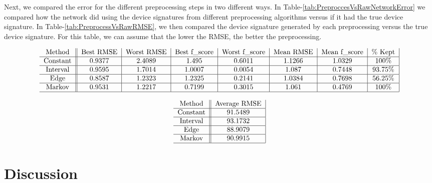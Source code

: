 \documentclass{article}
\begin{document}
Next, we compared the error for the different preprocessing steps in two different ways.
In Table-\ref{tab:PreproccesVsRawNetworkError} we compared how the network did using the device signatures from different preprocessing algorithms versus if it had the true device signature.
In Table-\ref{tab:PreprocessVsRawRMSE}, we then compared the device signature generated by each preprocessing versus the true device signature.
For this table, we can assume that the lower the RMSE, the better the preprocessing.

\begin{table*}[t]
	\centering
	
$$\begin{tabular}{c||c|c|c|c|c|c|c|}
Method & Best RMSE & Worst RMSE & Best f\_score & Worst f\_score & Mean RMSE & Mean f\_score & \% Kept\\
\hline
Constant & 0.9377 & 2.4089 & 1.495 & 0.6011 & 1.1266 & 1.0329 & 100\% \\
\hline
Interval & 0.9595 & 1.7014 & 1.0007 & 0.0054 & 1.087 & 0.7448 & 93.75\% \\
\hline
Edge & 0.8587 & 1.2323 & 1.2325 & 0.2141 & 1.0384 & 0.7698 & 56.25\%  \\
\hline
Markov & 0.9531 & 1.2217 & 0.7199 & 0.3015 & 1.061 & 0.4769 & 100\%  \\
\hline
\end{tabular}$$

\label{tab:PreproccesVsRawNetworkError} 
\end{table*}


\begin{table}
	\centering
	
$$\begin{tabular}{c||c|}
Method & Average RMSE\\
\hline
Constant & 91.5489\\
\hline
Interval & 93.1732 \\
\hline
Edge & 88.9079 \\
\hline
Markov & 90.9915 \\
\hline
\end{tabular}$$
\label{tab:PreprocessVsRawRMSE}
\end{table}


\section{Discussion}
\end{document}
